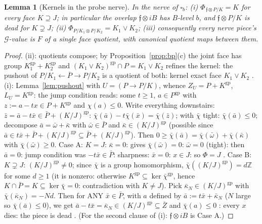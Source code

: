 \documentclass[11pt]{article}
\newtheorem{lemma}[theorem]{Lemma}
\theoremstyle{definition}
\newcommand{\gp}{\mathrm{gp}}
\newcommand{\Z}{\mathbb{Z}}
\begin{document}
\begin{lemma}[Kernels in the probe nerve]\label{lem:nerve}
In the nerve of $\square_b$:
\textup{(}i\textup{)} $\Phi_{\,\mathfrak f\otimes P/K}=K$ for every
face $K\supseteq J$; in particular the overlap $\mathfrak
f\otimes iB$ has $B$-level $b$, and $\mathfrak f\otimes
P/K$ is dead for $K\supsetneq J$;
\textup{(}ii\textup{)} $\Phi_{P/K_1\otimes P/K_2}=K_1\vee K_2$;
\textup{(}iii\textup{)} consequently every nerve piece's $\mathcal
G$-value is $F$ of a single face quotient, with canonical
quotient maps between them.
\end{lemma}

\begin{proof}
(ii): quotients compose; by Proposition~\ref{prop:bp}(c) the joint
face has group $K_1^{\gp}+K_2^{\gp}$ and
$(K_1\vee K_2)^{\gp}\cap P=K_1\vee K_2$ refines the kernel: the
pushout of $P/K_1\leftarrow\bar P\to P/K_2$ is a quotient of both:
kernel exact face $K_1\vee K_2$ \checkmark.
(i): Lemma~\ref{lem:pushout} with $U=(P\to P/K)$, whence
$Z_U=P+K^{\gp}$, $L_U=K^{\gp}$: the jump condition reads: some
$t\ge1$, $a\in P^{\gp}$ with $z:=a-tx\in P+K^{\gp}$ and
$\chi(a)\le0$. Write everything downstairs:
$\bar z=\bar a-t\bar x\in\bar P+(K/J)^{\gp}$:
$\bar\chi(\bar a)-t\bar\chi(\bar x)=\bar\chi(\bar z)$; with
$\bar\chi$ tight: $\bar\chi(\bar a)\le0$; decompose
$\bar a=\bar\omega+\bar\kappa$ with $\bar\omega\in\bar P$ and
$\bar\kappa\in (K/J)^{\gp}$ \textup{(}possible since
$\bar a\in t\bar x+\bar P+(K/J)^{\gp}\subseteq
\bar P+(K/J)^{\gp}$\textup{)}. Then
$0\ge\bar\chi(\bar a)=\bar\chi(\bar\omega)+\bar\chi(\bar\kappa)$
with $\bar\chi(\bar\omega)\ge0$. Case A: $K=J$: $\bar\kappa=0$:
gives $\bar\chi(\bar\omega)=0$: $\bar\omega=0$ (tight): then
$\bar a=0$: jump condition was $-t\bar x\in\bar P$: sharpness:
$\bar x=0$: $x\in J$: so $\Phi=J$ \checkmark. Case B: $K\supsetneq J$:
$(K/J)^{\gp}\ne0$; since $\bar\chi$ is a group homomorphism,
$\bar\chi((K/J)^{\gp})=d\Z$ for some $d\ge1$ (it is nonzero:
otherwise $K^{\gp}\subseteq\ker\bar\chi^{\gp}$, hence
$K\cap\bar P=K\subseteq\ker\bar\chi=0$: contradiction with
$K\ne J$). Pick $\bar\kappa_N\in(K/J)^{\gp}$ with
$\bar\chi(\bar\kappa_N)=-Nd$. Then for ANY $\bar x\in\bar P$, with
$a$ defined by $\bar a:=t\bar x+\bar\kappa_N$ ($N$ large so
$\bar\chi(\bar a)\le0$), we get $\bar a-t\bar x=\bar\kappa_N\in
(K/J)^{\gp}\subseteq\bar Z$ \checkmark and $\bar\chi(a)\le0$ \checkmark: every $x$
dies: the piece is dead \checkmark. (For the second clause of (i):
$\mathfrak f\otimes iB$ is Case A.)
\end{proof}
\end{document}
